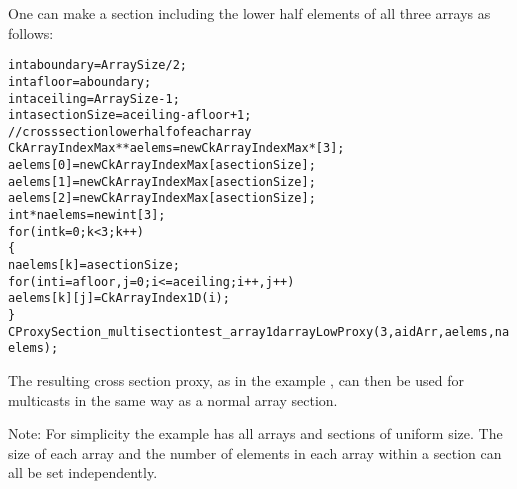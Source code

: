 One can make a section including the  lower half elements of all three
arrays as follows:

\begin{alltt}
	  int aboundary=ArraySize/2;
	  int afloor=aboundary;
	  int aceiling=ArraySize-1;
	  int asectionSize=aceiling-afloor+1;
	  // cross section lower half of each array
	  CkArrayIndexMax **aelems= new CkArrayIndexMax*[3];
	  aelems[0]= new CkArrayIndexMax[asectionSize];
	  aelems[1]= new CkArrayIndexMax[asectionSize];
	  aelems[2]= new CkArrayIndexMax[asectionSize];
	  int *naelems=new int[3];
	  for(int k=0;k<3;k++)
	    \{
	      naelems[k]=asectionSize;
	      for(int i=afloor,j=0;i<=aceiling;i++,j++)
	        aelems[k][j]=CkArrayIndex1D(i);
	    \}
	  CProxySection\_multisectiontest\_array1d arrayLowProxy(3,aidArr,aelems,naelems);
\end{alltt}



The resulting cross section proxy, as in the example ,
can then be used for multicasts in the same way as a normal array
section.

Note: For simplicity the example has all arrays and sections of uniform
size.  The size of each array and the number of elements in each array
within a section can all be set independently.


